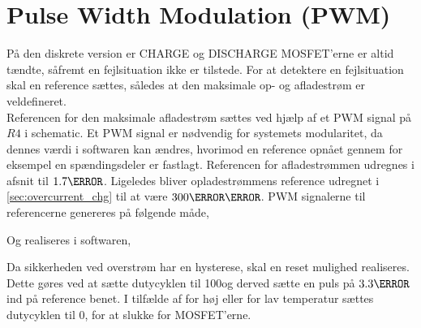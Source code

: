 \section{Pulse Width Modulation (PWM)}
På den diskrete version er CHARGE og DISCHARGE MOSFET'erne er altid tændte, såfremt en fejlsituation ikke er tilstede. For at detektere en fejlsituation skal en reference sættes, således at den maksimale op- og afladestrøm er veldefineret.
\\

Referencen for den maksimale afladestrøm sættes ved hjælp af et PWM signal på $R4$ i schematic. Et PWM signal er nødvendig for systemets modularitet, da dennes værdi i softwaren kan ændres, hvorimod en reference opnået gennem for eksempel en spændingsdeler er fastlagt. Referencen for afladestrømmen udregnes i afsnit \label{sec:overcurrent_dsg} til $1.7\volt$. Ligeledes bliver opladestrømmens reference udregnet i \ref{sec:overcurrent_chg} til at være $300\milli\volt$. PWM signalerne til referencerne genereres på følgende måde,


Og realiseres i softwaren,


Da sikkerheden ved overstrøm har en hysterese, skal en reset mulighed realiseres. Dette gøres ved at sætte dutycyklen til 100\percent og derved sætte en puls på $3.3\volt$ ind på reference benet. I tilfælde af for høj eller for lav temperatur sættes dutycyklen til 0\percent, for at slukke for MOSFET'erne.

